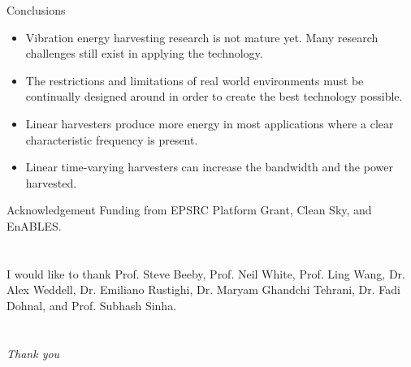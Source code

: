 \documentclass[LaTeX2e,10pt]{beamer}
\begin{document}
\begin{frame}{Conclusions}
\begin{itemize}
\setlength\itemsep{0.75cm}
\item Vibration energy harvesting research is not mature yet. Many research challenges still exist in applying the technology.
\item The restrictions and limitations of real world environments must be continually designed around in order to create the best technology possible.
\item Linear harvesters produce more energy in most applications where a clear characteristic frequency is present.
\item Linear time-varying harvesters can increase the bandwidth and the power harvested.
\end{itemize} 
\end{frame}
\begin{frame}{Acknowledgement}
\centering \Large
Funding from EPSRC Platform Grant, Clean Sky, and EnABLES.
\\~\\~\\ \small
I would like to thank Prof. Steve Beeby, Prof. Neil White, Prof. Ling Wang, Dr. Alex Weddell, Dr. Emiliano Rustighi, Dr. Maryam Ghandchi Tehrani, Dr. Fadi Dohnal, and Prof. Subhash Sinha.
\\~\\~\\
\emph{Thank you}
\end{frame}
\end{document}

